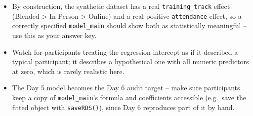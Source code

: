 \documentclass[11pt]{article}
\providecommand{\tightlist}{%
  \setlength{\itemsep}{0pt}\setlength{\parskip}{0pt}}
\begin{document}
\begin{itemize}
\tightlist
\item
  By construction, the synthetic dataset has a real
  \texttt{training\_track} effect (Blended \textgreater{} In-Person
  \textgreater{} Online) and a real positive \texttt{attendance} effect,
  so a correctly specified \texttt{model\_main} should show both as
  statistically meaningful -- use this as your answer key.
\item
  Watch for participants treating the regression intercept as if it
  described a typical participant; it describes a hypothetical one with
  all numeric predictors at zero, which is rarely realistic here.
\item
  The Day 5 model becomes the Day 6 audit target -- make sure
  participants keep a copy of \texttt{model\_main}'s formula and
  coefficients accessible (e.g.~save the fitted object with
  \texttt{saveRDS()}), since Day 6 reproduces part of it by hand.
\end{itemize}
\end{document}
